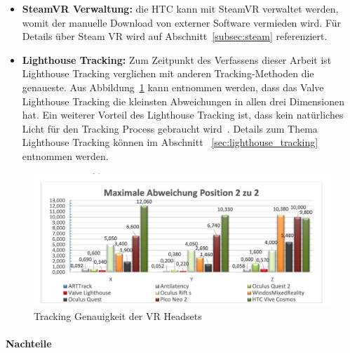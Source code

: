 \begin{itemize}
    \item \textbf{SteamVR Verwaltung:} die HTC kann mit SteamVR verwaltet werden, womit der manuelle Download von externer Software vermieden wird.
    Für Details über Steam VR wird auf Abschnitt~\ref{subsec:steam} referenziert.
    \item \textbf{Lighthouse Tracking:} Zum Zeitpunkt des Verfassens dieser Arbeit ist Lighthouse Tracking verglichen mit anderen Tracking-Methoden die genaueste.
    Aus Abbildung~\ref{fig:tracking_precision_statistic} kann entnommen werden, dass das Valve Lighthouse Tracking die kleinsten Abweichungen in allen drei Dimensionen hat.
    Ein weiterer Vorteil des Lighthouse Tracking ist, dass kein natürliches Licht für den Tracking Process gebraucht wird~\cite{Dennis_Ziesecke_2019}.
    Details zum Thema Lighthouse Tracking können im Abschnitt ~\ref{sec:lighthouse_tracking} entnommen werden.
\end{itemize}

\begin{figure}
    \centering
    \includegraphics[scale=0.4]{pics/tracking_precision_statistic}
    \caption{Tracking Genauigkeit der VR Headsets~\cite{Macedo_2020}}
    \label{fig:tracking_precision_statistic}
\end{figure}

\paragraph{Nachteile}

